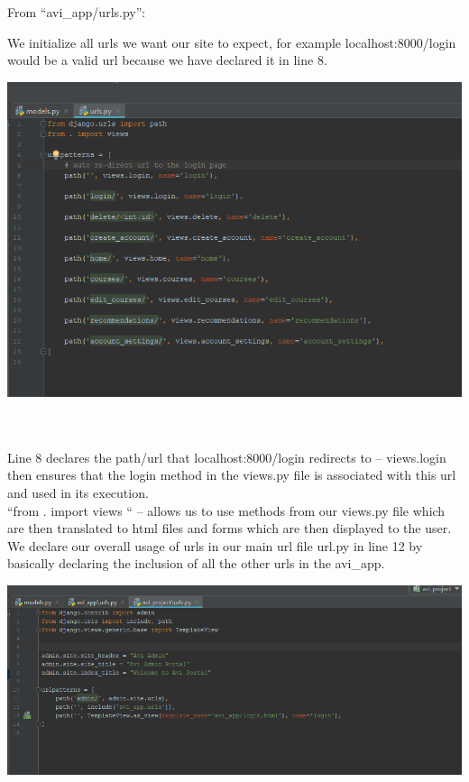 \documentclass[10pt]{article}
\begin{document}
From “avi\_app/urls.py”:

We initialize all urls we want our site to expect, for example localhost:8000/login would be a valid url because we have declared it in line 8.

\begin{center}
\includegraphics[width=1.1\textwidth]{p4.png}
\end{center} \\ \\

Line 8 declares the path/url that localhost:8000/login redirects to – views.login then ensures that the login method in the views.py file is associated with this url and used in its execution. \\

“from . import views “ – allows us to use methods from our views.py file which are then translated to html files and forms which are then displayed to the user. \\

We declare our overall usage of urls in our main url file url.py in line 12 by basically declaring the inclusion of all the other urls in the avi\_app.

\begin{center}
\includegraphics[width=1.1\textwidth]{p5.png}
\end{center} \\ \\
\end{document}
